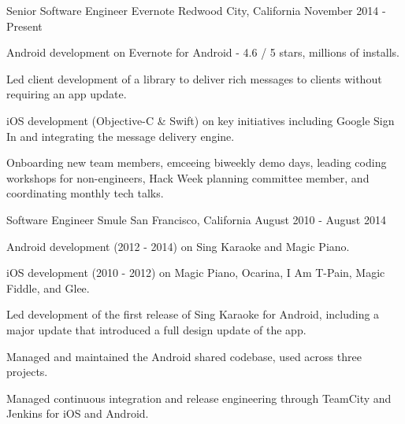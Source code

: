 

\begin{cventries}

  \cventry
    {Senior Software Engineer} %
    {Evernote} %
    {Redwood City, California} %
    {November 2014 - Present} %
    {
      \begin{cvitems} %
        \item {Android development on Evernote for Android - 4.6 / 5 stars, millions of installs.}
        \item {Led client development of a library to deliver rich messages to clients without requiring an app update.}
        \item {iOS development (Objective-C \& Swift) on key initiatives including Google Sign In and integrating the message delivery engine.}
		\item {Onboarding new team members, emceeing biweekly demo days, leading coding workshops for non-engineers, Hack Week planning committee member, and coordinating monthly tech talks.}
      \end{cvitems}
    }
    
  \cventry
    {Software Engineer} %
    {Smule} %
    {San Francisco, California} %
    {August 2010 - August 2014} %
    {
      \begin{cvitems} %
        \item {Android development (2012 - 2014) on Sing Karaoke and Magic Piano.}
        \item {iOS development (2010 - 2012) on Magic Piano, Ocarina, I Am T-Pain, Magic Fiddle, and Glee.}
        \item {Led development of the first release of Sing Karaoke for Android, including a major update that introduced a full design update of the app.}
        \item {Managed and maintained the Android shared codebase, used across three projects.}
        \item {Managed continuous integration and release engineering through TeamCity and Jenkins for iOS and Android.}
      \end{cvitems}
    }
    

\end{cventries}
